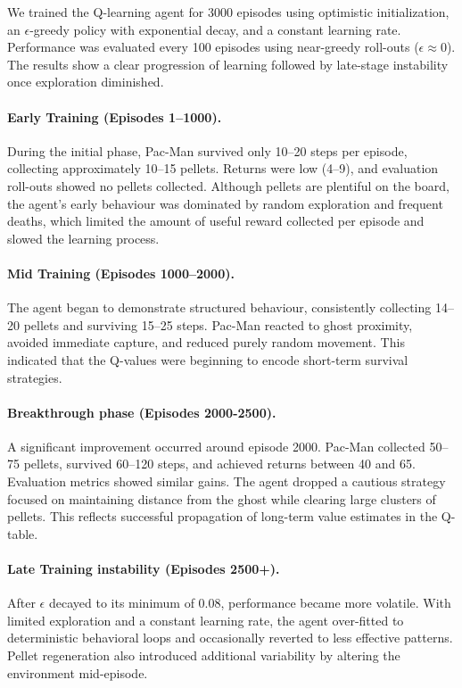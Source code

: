 \documentclass{article}
\begin{document}
We trained the Q-learning agent for 3000 episodes using optimistic initialization, an $\epsilon$-greedy policy with exponential decay, and a constant learning rate. Performance was evaluated every 100 episodes using near-greedy roll-outs ($\epsilon \approx 0$). The results show a clear progression of learning followed by late-stage instability once exploration diminished.

\paragraph{Early Training (Episodes 1--1000).}
During the initial phase, Pac-Man survived only 10--20 steps per episode, collecting approximately 10--15 pellets. Returns were low (4--9), and evaluation roll-outs showed no pellets collected. Although pellets are plentiful on the board, the agent's early behaviour was dominated by random exploration and frequent deaths, which limited the amount of useful reward collected per episode and slowed the learning process.

\paragraph{Mid Training (Episodes 1000--2000).}
The agent began to demonstrate structured behaviour, consistently collecting 14--20 pellets and surviving 15--25 steps. Pac-Man reacted to ghost proximity, avoided immediate capture, and reduced purely random movement. This indicated that the Q-values were beginning to encode short-term survival strategies.

\paragraph{Breakthrough phase (Episodes 2000-2500).}
A significant improvement occurred around episode 2000. Pac-Man collected 50--75 pellets, survived 60--120 steps, and achieved returns between 40 and 65. Evaluation metrics showed similar gains. The agent dropped a cautious strategy focused on maintaining distance from the ghost while clearing large clusters of pellets. This reflects successful propagation of long-term value estimates in the Q-table.

\paragraph{Late Training instability (Episodes 2500+).}
After $\epsilon$ decayed to its minimum of 0.08, performance became more volatile. With limited exploration and a constant learning rate, the agent over-fitted to deterministic behavioral loops and occasionally reverted to less effective patterns. Pellet regeneration also introduced additional variability by altering the environment mid-episode.
\end{document}
